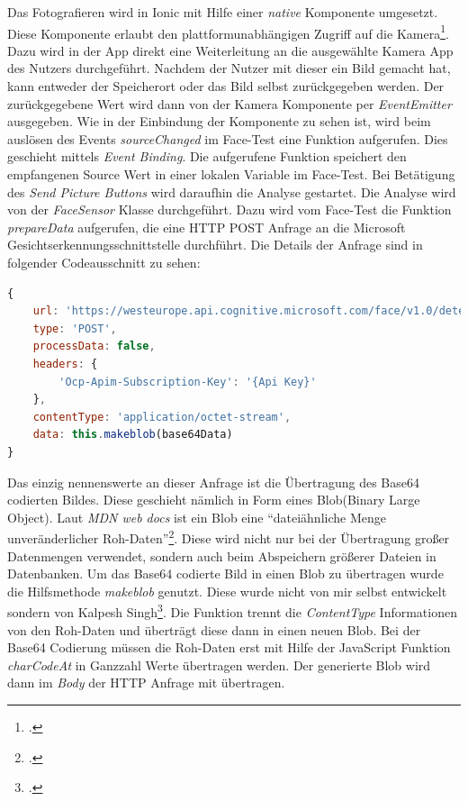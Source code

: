 Das Fotografieren wird in Ionic mit Hilfe einer \textit{native} Komponente umgesetzt. Diese Komponente erlaubt den plattformunabhängigen Zugriff auf die Kamera\footcite{Ion18e}. Dazu wird in der App direkt eine Weiterleitung an die ausgewählte Kamera App des Nutzers durchgeführt. Nachdem der Nutzer mit dieser ein Bild gemacht hat, kann entweder der Speicherort oder das Bild selbst zurückgegeben werden. Der zurückgegebene Wert wird dann von der Kamera Komponente per \textit{EventEmitter} ausgegeben.\newline
Wie in der Einbindung der Komponente zu sehen ist, wird beim auslösen des Events \textit{sourceChanged} im Face-Test eine Funktion aufgerufen. Dies geschieht mittels \textit{Event Binding}. Die aufgerufene Funktion speichert den empfangenen Source Wert in einer lokalen Variable im Face-Test. Bei Betätigung des \textit{Send Picture Buttons} wird daraufhin die Analyse gestartet. Die Analyse wird von der \textit{FaceSensor} Klasse durchgeführt. Dazu wird vom Face-Test die Funktion \textit{prepareData} aufgerufen, die eine HTTP POST Anfrage an die Microsoft Gesichtserkennungsschnittstelle durchführt. Die Details der Anfrage sind in folgender Codeausschnitt zu sehen:
\begin{lstlisting}[caption={Aufbau Anfrage an Gesichtserkennungsschnittstelle}, language=JavaScript]
{
	url: 'https://westeurope.api.cognitive.microsoft.com/face/v1.0/detect?returnFaceAttributes=emotion',
	type: 'POST',
	processData: false,
	headers: {
		'Ocp-Apim-Subscription-Key': '{Api Key}'
	},
	contentType: 'application/octet-stream',
	data: this.makeblob(base64Data)
}
\end{lstlisting}
Das einzig nennenswerte an dieser Anfrage ist die Übertragung des Base64 codierten Bildes. Diese geschieht nämlich in Form eines Blob(Binary Large Object). Laut \textit{MDN web docs} ist ein Blob eine ``dateiähnliche Menge unveränderlicher Roh-Daten''\footcite[Vgl. ][Abschnitt Übersicht]{Mdn18}. Diese wird nicht nur bei der Übertragung großer Datenmengen verwendet, sondern auch beim Abspeichern größerer Dateien in Datenbanken. Um das Base64 codierte Bild in einen Blob zu übertragen wurde die Hilfsmethode \textit{makeblob} genutzt. Diese wurde nicht von mir selbst entwickelt sondern von Kalpesh Singh\footcite[Vgl. ][Antwort von Kalpesh Singh]{Sin16}. Die Funktion trennt die \textit{ContentType} Informationen von den Roh-Daten und überträgt diese dann in einen neuen Blob. Bei der Base64 Codierung müssen die Roh-Daten erst mit Hilfe der JavaScript Funktion \textit{charCodeAt} in Ganzzahl Werte übertragen werden. Der generierte Blob wird dann im \textit{Body} der HTTP Anfrage mit übertragen.\newline
